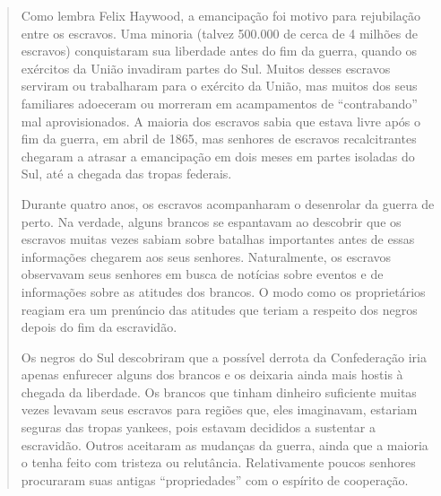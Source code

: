 \begin{quote}
Como lembra Felix Haywood, a emancipação foi motivo para
rejubilação entre os escravos. Uma minoria (talvez 500.000 de cerca de 4
milhões de escravos) conquistaram sua liberdade antes do fim da guerra,
quando os exércitos da União invadiram partes do Sul. Muitos desses
escravos serviram ou trabalharam para o exército da União, mas muitos
dos seus familiares adoeceram ou morreram em acampamentos de
``contrabando'' mal aprovisionados. A maioria dos escravos sabia que
estava livre após o fim da guerra, em abril de 1865, mas senhores de
escravos recalcitrantes chegaram a atrasar a emancipação em dois meses
em partes isoladas do Sul, até a chegada das tropas federais.

Durante quatro anos, os escravos acompanharam o desenrolar da
guerra de perto. Na verdade, alguns brancos se espantavam ao descobrir
que os escravos muitas vezes sabiam sobre batalhas importantes antes de
essas informações chegarem aos seus senhores. Naturalmente, os escravos
observavam seus senhores em busca de notícias sobre eventos e de
informações sobre as atitudes dos brancos. O modo como os proprietários
reagiam era um prenúncio das atitudes que teriam a respeito dos negros
depois do fim da escravidão.

Os negros do Sul descobriram que a possível derrota da
Confederação iria apenas enfurecer alguns dos brancos e os deixaria
ainda mais hostis à chegada da liberdade. Os brancos que tinham dinheiro
suficiente muitas vezes levavam seus escravos para regiões que, eles
imaginavam, estariam seguras das tropas yankees, pois estavam decididos
a sustentar a escravidão. Outros aceitaram as mudanças da guerra, ainda
que a maioria o tenha feito com tristeza ou relutância. Relativamente
poucos senhores procuraram suas antigas ``propriedades'' com o espírito
de cooperação.
\end{quote}

